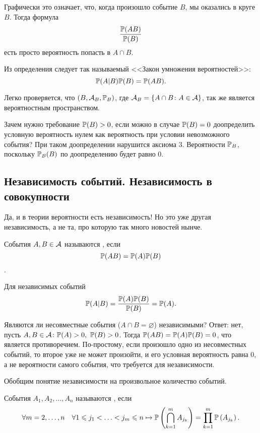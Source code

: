 \documentclass[../TV&MS.tex]{subfiles}
\begin{document}
\noindent
\parbox[b][3 cm][t]{40mm}{}
\hfill
\parbox[b][3 cm][t]{80mm}{
	Графически это означает, что, когда произошло событие $B$, мы оказались в круге $B$. 
	Тогда формула $$\frac{\mathbb{P}(AB)}{\mathbb{P}(B)}$$ есть просто вероятность попасть в $A\cap B$.
}

\newpage

Из определения следует так называемый <<Закон умножения вероятностей>>:
$$\mathbb{P}(A|B)\mathbb{P}(B)=\mathbb{P}(AB).$$

Легко проверяется, что $(B, \mathcal{A}_B, \mathbb{P}_B)$, где $\mathcal{A}_B = \left\{ A \cap B \colon A \in \mathcal{A} \right\}$, 
так же является вероятностным пространством. \\
\begin{Wtf}
Зачем нужно требование $\mathbb{P}(B) > 0$, если можно в случае $\mathbb{P}(B) = 0$ доопределить 
условную вероятность нулем как вероятность при условии невозможного события?
При таком доопределении нарушится аксиома $3$. Вероятности $\mathbb{P}_B$, поскольку $\mathbb{P}_B(B)$ 
по доопределению будет равно $0$.
\end{Wtf}

\subsection{Независимость событий. Независимость в совокупности}

\qquad Да, и в теории вероятности есть независимость! Но это уже другая независимость, 
а не та, про которую так много новостей нынче.

\begin{Def}
События $A, B \in \mathcal{A}$ называются , если 
$$\mathbb{P}(AB) = \mathbb{P}(A) \mathbb{P}(B)$$.
\end{Def}

Для независимых событий $$\mathbb{P}(A|B) = \frac{\mathbb{P}(A)\mathbb{P}(B)}{\mathbb{P}(B)} = \mathbb{P}(A).$$

\begin{Ex}
Являются ли несовместные события ($A\cap B = \varnothing$) независимыми? 
Ответ: нет, пусть  $A, B \in \mathcal{A} \colon \mathbb{P}(A) > 0, \ \mathbb{P}(B) > 0$. 
Тогда $\mathbb{P}(AB) = \mathbb{P}(A)\mathbb{P}(B) = 0$, что является противоречием. По-простому, 
если произошло одно из несовместных событий, то второе уже не может произойти, 
и его условная вероятность равна $0$, а не вероятности самого события, 
что требуется для независимости.
\end{Ex}

Обобщим понятие независимости на произвольное количество событий.

\begin{Def}
События $A_1, A_2, \dots, A_n$ называются , если 
$$\forall m = 2, \dots, n \quad \forall 1 \leqslant j_1 < \ldots < j_m \leqslant n \mapsto 
\mathbb{P}\left(\bigcap_{k=1}^{m}A_{j_k}\right)=\prod_{k=1}^{m} \mathbb{P}\left(A_{j_k}\right).$$
\end{Def}
\end{document}
